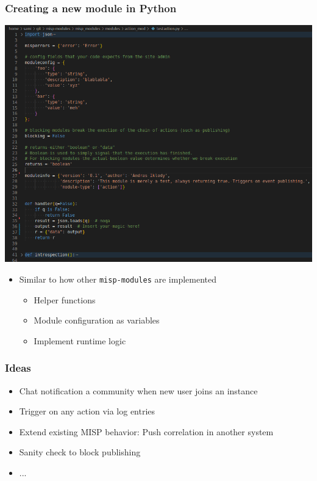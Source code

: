 \begin{frame}
    \frametitle{Creating a new module in Python}
    \begin{center}
        \includegraphics[width=0.65\linewidth]{pictures/custom-2.png}
    \end{center}

    \begin{itemize}
        \item Similar to how other \texttt{misp-modules} are implemented
        \begin{itemize}
            \item Helper functions
            \item Module configuration as variables
            \item Implement runtime logic
        \end{itemize}
    \end{itemize}
\end{frame}

\begin{frame}
    \frametitle{Ideas}
    \begin{itemize}
        \item Chat notification a community when new user joins an instance
        \item Trigger on any action via log entries
        \item Extend existing MISP behavior: Push correlation in another system
        \item Sanity check to block publishing
        \item ...
    \end{itemize}
\end{frame}

